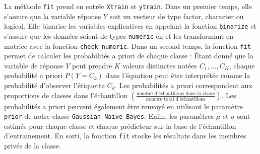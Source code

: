 \documentclass[]{article}
\begin{document}
\vspace{0.4\baselineskip}
La méthode \texttt{fit} prend en entrée \texttt{Xtrain} et \texttt{ytrain}. Dans un premier temps, elle s'assure que la variable réponse \(Y\) soit un vecteur de type factor, character ou logical. Elle binarise les variables explicatives en appelant la fonction \texttt{binarize} et s'assure que les données soient de types \texttt{numeric} en et les transformant en matrice avec la fonction \texttt{check\_numeric}. Dans un second temps, la fonction \texttt{fit} permet de calculer les probabilités a priori de chaque classe : Étant donné que la variable de réponse \(Y\) peut prendre \(K\) valeurs distinctes notées \(C_1, \ldots, C_K\), chaque probabilité a priori \(P(Y = C_k)\) dans l'équation peut être interprétée comme la probabilité d'observer l'étiquette \(C_k\). Les probabilités a priori correspondent aux proportions de classes dans l'échantillon \(\left(\frac{\text{nombre d'échantillons dans la classe}}{\text{nombre total d'échantillons}}\right)\). Les probabilités a priori peuvent également être renvoyé en utilisant le paramètre \texttt{prior} de notre classe \texttt{Gaussian\_Naive\_Bayes}. Enfin, les paramètres \(\mu\) et \(\sigma\) sont estimés pour chaque classe et chaque prédicteur sur la base de l'échantillon d'entrainement. En sorti, la fonction \texttt{fit} stocke les résultats dans les membres privés de la classe.
\vspace{0.1\baselineskip}
\end{document}
